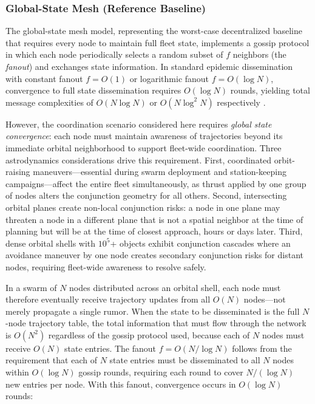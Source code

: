 \documentclass[journal]{IEEEtran}
\begin{document}
\subsubsection{Global-State Mesh (Reference Baseline)}

The global-state mesh model, representing the worst-case decentralized baseline that requires every node to maintain full fleet state, implements a gossip protocol in which each node periodically selects a random subset of $f$ neighbors (the \emph{fanout}) and exchanges state information. In standard epidemic dissemination with constant fanout $f = O(1)$ or logarithmic fanout $f = O(\log N)$, convergence to full state dissemination requires $O(\log N)$ rounds, yielding total message complexities of $O(N \log N)$ or $O(N \log^2 N)$ respectively \cite{demers_gossip}.

However, the coordination scenario considered here requires \emph{global state convergence}: each node must maintain awareness of trajectories beyond its immediate orbital neighborhood to support fleet-wide coordination. Three astrodynamics considerations drive this requirement. First, coordinated orbit-raising maneuvers---essential during swarm deployment and station-keeping campaigns---affect the entire fleet simultaneously, as thrust applied by one group of nodes alters the conjunction geometry for all others. Second, intersecting orbital planes create non-local conjunction risks: a node in one plane may threaten a node in a different plane that is not a spatial neighbor at the time of planning but will be at the time of closest approach, hours or days later. Third, dense orbital shells with $10^5$+ objects exhibit conjunction cascades where an avoidance maneuver by one node creates secondary conjunction risks for distant nodes, requiring fleet-wide awareness to resolve safely.

In a swarm of $N$ nodes distributed across an orbital shell, each node must therefore eventually receive trajectory updates from all $O(N)$ nodes---not merely propagate a single rumor. When the state to be disseminated is the full $N$-node trajectory table, the total information that must flow through the network is $O(N^2)$ regardless of the gossip protocol used, because each of $N$ nodes must receive $O(N)$ state entries. The fanout $f = O(N / \log N)$ follows from the requirement that each of $N$ state entries must be disseminated to all $N$ nodes within $O(\log N)$ gossip rounds, requiring each round to cover $N / (\log N)$ new entries per node. With this fanout, convergence occurs in $O(\log N)$ rounds:
\end{document}
